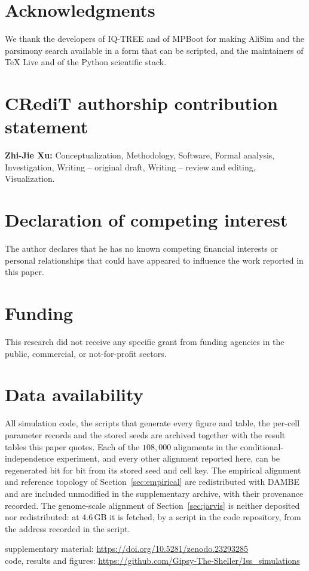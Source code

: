 \documentclass[preprint,12pt,authoryear]{elsarticle}
\theoremstyle{definition}
\theoremstyle{remark}
\begin{document}

\section*{Acknowledgments}
We thank the developers of IQ-TREE and of MPBoot for making AliSim and the
parsimony search available in a form that can be scripted, and the maintainers
of TeX Live and of the Python scientific stack.

\section*{CRediT authorship contribution statement}

\textbf{Zhi-Jie Xu:} Conceptualization, Methodology, Software, Formal
analysis, Investigation, Writing -- original draft, Writing -- review and
editing, Visualization.

\section*{Declaration of competing interest}

The author declares that he has no known competing financial interests or
personal relationships that could have appeared to influence the work reported
in this paper.

\section*{Funding}

This research did not receive any specific grant from funding agencies in the
public, commercial, or not-for-profit sectors.

\section*{Data availability}
All simulation code, the scripts that generate every figure and table, the
per-cell parameter records and the stored seeds are archived together with
the result tables this paper quotes. Each of the $108{,}000$ alignments in
the conditional-independence experiment, and every other alignment reported
here, can be regenerated bit for bit from its stored seed and cell key. The
empirical alignment and reference topology of Section~\ref{sec:empirical}
are redistributed with DAMBE and are included unmodified in the
supplementary archive, with their provenance recorded. The genome-scale
alignment of Section~\ref{sec:jarvis} is neither deposited nor redistributed:
at 4.6\,GB it is fetched, by a script in the code repository, from the
address recorded in the script.

\begin{center}
supplementary material: \url{https://doi.org/10.5281/zenodo.23293285}\\
code, results and figures: \url{https://github.com/Gipsy-The-Sheller/Iss_simulations}
\end{center}



\end{document}
